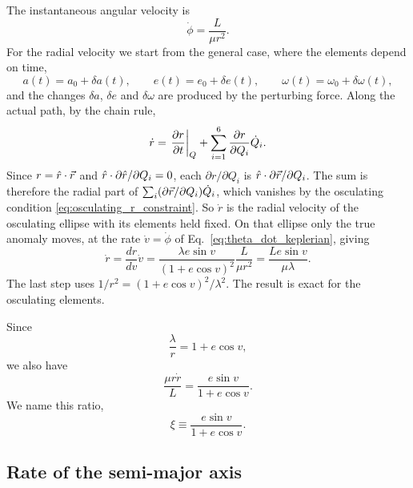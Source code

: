 	The instantaneous angular velocity is
	\begin{equation}
		\dot\phi
		=
		\frac{L}{\mu r^2}.
		\label{eq:theta_dot_keplerian}
	\end{equation}
	For the radial velocity we start from the general case, where the elements depend on time,
	\begin{equation}
		a(t)=a_0+\delta a(t),\qquad
		e(t)=e_0+\delta e(t),\qquad
		\omega(t)=\omega_0+\delta\omega(t),
	\end{equation}
	and the changes $\delta a$, $\delta e$ and $\delta\omega$ are produced by the perturbing force. Along the actual path, by the chain rule,
	\begin{align}
		\dot r
		=
		\left.\pdv{r}{t}\right|_Q
		+
		\sum_{i=1}^{6}\pdv{r}{Q_i}\dot Q_i .
	\end{align}
	Since $r=\hat r\cdot\vec r$ and $\hat r\cdot\partial\hat r/\partial Q_i=0$, each $\partial r/\partial Q_i$ is $\hat r\cdot\partial\vec r/\partial Q_i$. The sum is therefore the radial part of $\sum_i(\partial\vec r/\partial Q_i)\dot Q_i$, which vanishes by the osculating condition \eqref{eq:osculating_r_constraint}. So $\dot r$ is the radial velocity of the osculating ellipse with its elements held fixed. On that ellipse only the true anomaly moves, at the rate $\dot v=\dot\phi$ of Eq.~\eqref{eq:theta_dot_keplerian}, giving
	\begin{equation}
		\boxed{
			\dot r
			=
			\frac{dr}{dv}\dot v
			=
			\frac{\lambda e\sin v}{(1+e\cos v)^2}
			\frac{L}{\mu r^2}
			=
			\frac{Le\sin v}{\mu\lambda}.
		}
		\label{eq:rdot_true_anomaly}
	\end{equation}
	The last step uses $1/r^2=(1+e\cos v)^2/\lambda^2$. The result is exact for the osculating elements.
	
	Since
	\begin{equation}
		\frac{\lambda}{r}=1+e\cos v,
	\end{equation}
	we also have
	\begin{equation}
		\boxed{
			\frac{\mu r\dot r}{L}
			=
			\frac{e\sin v}{1+e\cos v}.
		}
		\label{eq:xi_relation}
	\end{equation}
	We name this ratio,
	\begin{equation}
		\boxed{
			\xi\equiv
			\frac{e\sin v}{1+e\cos v}.
		}
		\label{eq:xi_def}
	\end{equation}
	
	\subsection{Rate of the semi-major axis}
	
